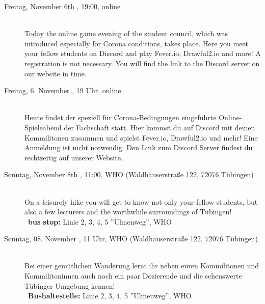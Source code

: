 \begin{description}


\ifml
    \item[Freitag, November 6th \YEAR, 19:00, online]\ \\
    Today the online game evening of the student council, which was introduced especially for Corona conditions, takes place. Here you meet your fellow students on Discord and play Fever.io, Drawful2.io and more! A registration is not necessary. You will find the link to the Discord server on our website in time.
\else
    \item[Freitag, 6. November \YEAR, 19 Uhr, online]\ \\
        Heute findet der speziell für Corona-Bedingungen eingeführte Online-Spieleabend der Fachschaft statt. Hier kommst du auf Discord mit deinen Kommilitonen zusammen und spielst Fever.io, Drawful2.io und mehr! Eine Anmeldung ist nicht notwendig. Den Link zum Discord Server findest du rechtzeitig auf unserer Website.
\fi

\ifml
    \item[Sonntag, November 8th \YEAR, 11:00, WHO (Waldhäuserstraße 122, 72076 Tübingen)]\ \\
    On a leisurely hike you will get to know not only your fellow students, but also a few lecturers and the worthwhile surroundings of Tübingen!\\
    ~\textbf{bus stop:} Linie 2, 3, 4, 5 ''Ulmenweg'', WHO
\else
    \item[Sonntag, 08. November \YEAR, 11 Uhr, WHO (Waldhäuserstraße 122, 72076 Tübingen)]\ \\
        Bei einer gemütlichen Wanderung lernt ihr neben euren Kommilitonen und Kommilitoninnen auch noch ein paar Dozierende und die sehenswerte Tübinger Umgebung kennen!\\
        ~\textbf{Bushaltestelle:} Linie 2, 3, 4, 5 ''Ulmenweg'', WHO
\fi


\end{description}
